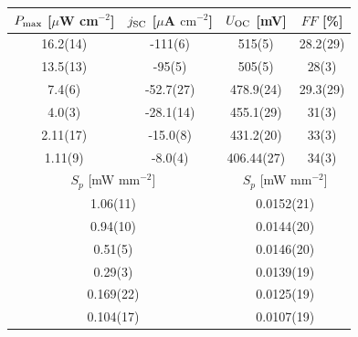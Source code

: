 \documentclass[a4paper,10pt,twocolumn]{article}
\begin{document}
\begin{extract*}
\begin{table}[]
	\begin{tabular}{@{}cccc@{}}
		\toprule
		$P_{\text{max}}$ [$\mu$W cm$^{-2}$] & $j_{\text{SC}}$ [$\mu$A $\mathrm{cm}^{-2}$] & $U_{\text{OC}}$ [mV]     & $FF$ [\%]     \\ \midrule
		16.2(14)                   & -111(6)                            & 515(5)          & 28.2(29)      \\
		13.5(13)                   & -95(5)                             & 505(5)          & 28(3)         \\
		7.4(6)                     & -52.7(27)                          & 478.9(24)       & 29.3(29)      \\
		4.0(3)                     & -28.1(14)                          & 455.1(29)       & 31(3)         \\
		2.11(17)                   & -15.0(8)                           & 431.2(20)       & 33(3)         \\
		1.11(9)                    & -8.0(4)                            & 406.44(27)      & 34(3)         \\ \midrule
		\multicolumn{2}{c}{$S_p$ [mW mm$^{-2}$]}                        & \multicolumn{2}{c}{$S_p$ [mW mm$^{-2}$]} \\ \midrule
		\multicolumn{2}{c}{1.06(11)}                                    & \multicolumn{2}{c}{0.0152(21)}  \\
		\multicolumn{2}{c}{0.94(10)}                                    & \multicolumn{2}{c}{0.0144(20)}  \\
		\multicolumn{2}{c}{0.51(5)}                                     & \multicolumn{2}{c}{0.0146(20)}  \\
		\multicolumn{2}{c}{0.29(3)}                                     & \multicolumn{2}{c}{0.0139(19)}  \\
		\multicolumn{2}{c}{0.169(22)}                                   & \multicolumn{2}{c}{0.0125(19)}  \\
		\multicolumn{2}{c}{0.104(17)}                                   & \multicolumn{2}{c}{0.0107(19)}  \\ \bottomrule
	\end{tabular}
\end{table}



\end{extract*}
\end{document}
